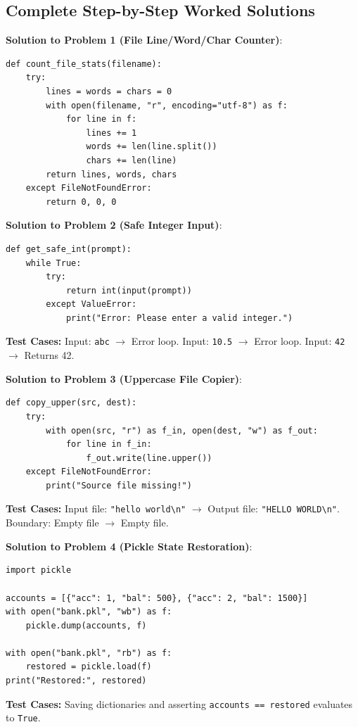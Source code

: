 \subsection{Complete Step-by-Step Worked Solutions}

\begin{solutionbox}
\noindent\textbf{Solution to Problem 1 (File Line/Word/Char Counter)}:
\begin{lstlisting}[language=Python3]
def count_file_stats(filename):
    try:
        lines = words = chars = 0
        with open(filename, "r", encoding="utf-8") as f:
            for line in f:
                lines += 1
                words += len(line.split())
                chars += len(line)
        return lines, words, chars
    except FileNotFoundError:
        return 0, 0, 0
\end{lstlisting}

\noindent\textbf{Solution to Problem 2 (Safe Integer Input)}:
\begin{lstlisting}[language=Python3]
def get_safe_int(prompt):
    while True:
        try:
            return int(input(prompt))
        except ValueError:
            print("Error: Please enter a valid integer.")
\end{lstlisting}
\textbf{Test Cases:} Input: \texttt{abc} $\to$ Error loop. Input: \texttt{10.5} $\to$ Error loop. Input: \texttt{42} $\to$ Returns 42.

\noindent\textbf{Solution to Problem 3 (Uppercase File Copier)}:
\begin{lstlisting}[language=Python3]
def copy_upper(src, dest):
    try:
        with open(src, "r") as f_in, open(dest, "w") as f_out:
            for line in f_in:
                f_out.write(line.upper())
    except FileNotFoundError:
        print("Source file missing!")
\end{lstlisting}
\textbf{Test Cases:} Input file: \texttt{"hello world\textbackslash n"} $\to$ Output file: \texttt{"HELLO WORLD\textbackslash n"}. Boundary: Empty file $\to$ Empty file.

\noindent\textbf{Solution to Problem 4 (Pickle State Restoration)}:
\begin{lstlisting}[language=Python3]
import pickle

accounts = [{"acc": 1, "bal": 500}, {"acc": 2, "bal": 1500}]
with open("bank.pkl", "wb") as f:
    pickle.dump(accounts, f)

with open("bank.pkl", "rb") as f:
    restored = pickle.load(f)
print("Restored:", restored)
\end{lstlisting}
\textbf{Test Cases:} Saving dictionaries and asserting \texttt{accounts == restored} evaluates to \texttt{True}.


\end{solutionbox}
